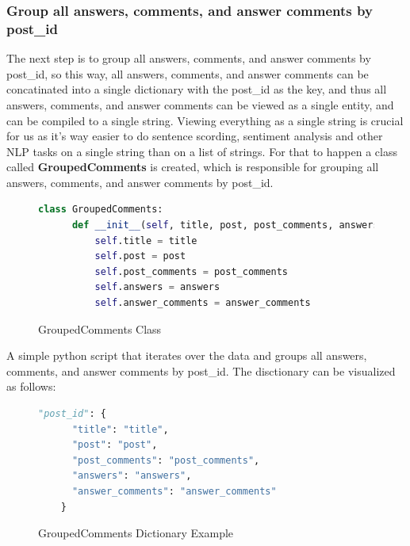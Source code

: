 

\subsubsection{Group all answers, comments, and answer comments by post\_id} \label{grouped_by_post}

The next step is to group all answers, comments, and answer comments by post\_id, so this way, all answers, comments, and answer comments can be concatinated into a single dictionary with the post\_id as the key, and thus all answers, comments, and answer comments can be viewed as a single entity, and can be compiled to a single string. Viewing everything as a single string is crucial for us as it's way easier to do sentence scording, sentiment analysis and other NLP tasks on a single string than on a list of strings. For that to happen a class called \textbf{GroupedComments} is created, which is responsible for grouping all answers, comments, and answer comments by post\_id.



\begin{figure}[H]
  \begin{lstlisting}[language=Python]
    class GroupedComments: 
      def __init__(self, title, post, post_comments, answers, answer_comments): 
          self.title = title
          self.post = post
          self.post_comments = post_comments
          self.answers = answers
          self.answer_comments = answer_comments
    \end{lstlisting}
  \caption{GroupedComments Class}
  \label{grouped_comments_class}
\end{figure}

A simple python script that iterates over the data and groups all answers, comments, and answer comments by post\_id. The disctionary can be visualized as follows:

\pagebreak


\begin{figure}[H]
  \begin{lstlisting}[language=Python]
    "post_id": {
      "title": "title",
      "post": "post",
      "post_comments": "post_comments",
      "answers": "answers",
      "answer_comments": "answer_comments"
    }
  \end{lstlisting}
  \caption{GroupedComments Dictionary Example}
  \label{grouped_comments_dict_example}
\end{figure}

